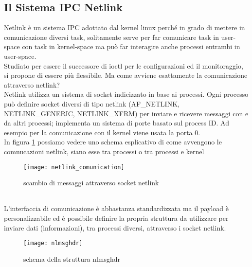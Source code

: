 \subsection{Il Sistema IPC Netlink}
Netlink \`e un sistema IPC adottato dal kernel linux perch\'e in grado di mettere in comunicazione diversi task, solitamente serve per far comunicare task in user-space con task in kernel-space ma pu\`o far interagire anche processi entrambi in user-space.\\
Studiato per essere il successore di ioctl per le configurazioni ed il monitoraggio, si propone di essere pi\`u flessibile.
Ma come avviene esattamente la comunicazione attraverso netlink?\\
Netlink utilizza un sistema di socket indicizzato in base ai processi. Ogni processo pu\`o definire socket diversi di tipo netlink (AF\_NETLINK, NETLINK\_GENERIC, NETLINK\_XFRM) per inviare e ricevere messaggi con e da altri processi; implementa un sistema di porte basato sul process ID. Ad esempio per la comunicazione con il kernel viene usata la porta 0.\\
In figura \ref{fig:netcom} possiamo vedere uno schema esplicativo di come avvengono le comnucazioni netlink, siano esse tra processi o tra processi e kernel
\begin{figure}[h]                       %
\begin{center}                          %
\texttt{[image: netlink\_comunication]}%
%
\caption[comunicazione netlink]{scambio di messaggi attraverso socket netlink}\label{fig:netcom}
\end{center}
\end{figure}\\
L'interfaccia di comunicazione \`e abbastanza standardizzata ma il payload \`e personalizzabile ed \`e possibile definire la propria struttura da utilizzare per inviare dati (informazioni), tra processi diversi, attraverso i socket netlink.
\begin{figure}[h]                       %
\begin{center}                          %
\texttt{[image: nlmsghdr]}%
%
\caption[struct nlmsghdr]{schema della struttura nlmsghdr}
\end{center}
\end{figure}\\
